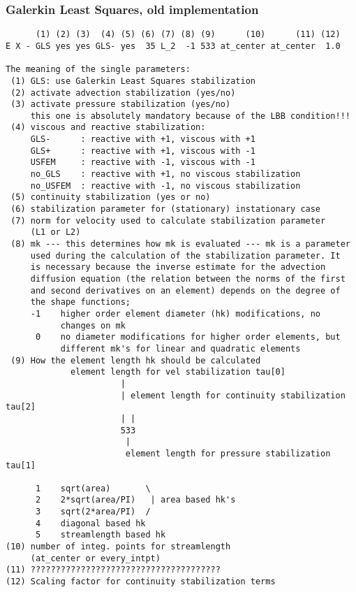 \subsubsection{Galerkin Least Squares, old implementation}
\begin{verbatim}
      (1) (2) (3)  (4) (5) (6) (7) (8) (9)      (10)      (11) (12)
E X - GLS yes yes GLS- yes  35 L_2  -1 533 at_center at_center  1.0

The meaning of the single parameters:
 (1) GLS: use Galerkin Least Squares stabilization
 (2) activate advection stabilization (yes/no)
 (3) activate pressure stabilization (yes/no)
     this one is absolutely mandatory because of the LBB condition!!!
 (4) viscous and reactive stabilization: 
     GLS-      : reactive with +1, viscous with +1
     GLS+      : reactive with +1, viscous with -1
     USFEM     : reactive with -1, viscous with -1
     no_GLS    : reactive with +1, no viscous stabilization
     no_USFEM  : reactive with -1, no viscous stabilization
 (5) continuity stabilization (yes or no)
 (6) stabilization parameter for (stationary) instationary case
 (7) norm for velocity used to calculate stabilization parameter
     (L1 or L2)
 (8) mk --- this determines how mk is evaluated --- mk is a parameter
     used during the calculation of the stabilization parameter. It
     is necessary because the inverse estimate for the advection
     diffusion equation (the relation between the norms of the first 
     and second derivatives on an element) depends on the degree of
     the shape functions;
     -1    higher order element diameter (hk) modifications, no 
           changes on mk
      0    no diameter modifications for higher order elements, but
           different mk's for linear and quadratic elements
 (9) How the element length hk should be calculated
             element length for vel stabilization tau[0]
                       |
                       | element length for continuity stabilization tau[2]
                       | |
                       533
                        |
                        element length for pressure stabilization tau[1]

      1    sqrt(area)       \
      2    2*sqrt(area/PI)   | area based hk's
      3    sqrt(2*area/PI)  /
      4    diagonal based hk
      5    streamlength based hk
(10) number of integ. points for streamlength 
     (at_center or every_intpt)
(11) ??????????????????????????????????????
(12) Scaling factor for continuity stabilization terms
\end{verbatim}
